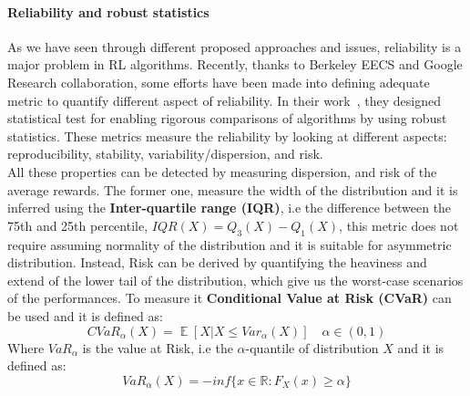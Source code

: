 \documentclass{article}
\DeclareMathOperator{\EX}{\mathbb{E}}%
\begin{document}
\paragraph{Reliability and robust statistics}
As we have seen through different proposed approaches and issues, reliability is a major problem in RL algorithms. Recently, thanks to  Berkeley EECS and Google Research collaboration, some efforts have been made into defining adequate metric to quantify different aspect of reliability. In their work~\cite{GoogleMeasure}, they designed statistical test for enabling rigorous comparisons of algorithms by using robust statistics. These metrics measure the reliability by looking at different aspects: reproducibility, stability, variability/dispersion, and risk.\\
All these properties can be detected by measuring dispersion, and risk of the average rewards. The former one, measure the width of the distribution and it is inferred using the \textbf{Inter-quartile range (IQR)}, i.e the difference between the 75th and 25th percentile, $ IQR(X) = Q_3(X) - Q_1(X)$, this metric does not require assuming normality of the distribution and it is suitable for asymmetric distribution.
Instead, Risk can be derived by quantifying the heaviness and extend of the lower tail of the distribution, which give us the worst-case scenarios of the performances. To measure it \textbf{Conditional Value at Risk (CVaR)} can be used and it is defined as:
\begin{equation}
CVaR_\alpha(X) = \EX \left[ X \vert X \leq Var_\alpha(X) \right]  \quad \alpha \in (0,1)
\end{equation}
Where $VaR_\alpha$ is the value at Risk, i.e the $\alpha$-quantile of distribution $X$ and it is defined as:
\begin{equation}
VaR_\alpha(X) = -inf \{ x \in \mathbb{R}: F_X(x) \ge \alpha \}
\end{equation}
\end{document}
